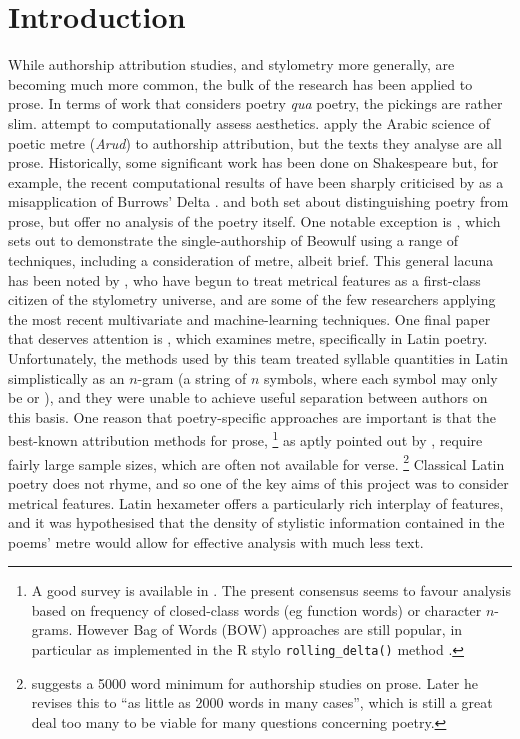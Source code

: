 \documentclass[11pt,a4paper]{scrartcl} %
\begin{document}
\setlength{\parindent}{0.3in}\section{Introduction}
While authorship attribution studies, and stylometry more generally, are becoming much more common, the bulk of the research has been applied to prose. In terms of work that considers poetry \textit{qua} poetry, the pickings are rather slim.  attempt to computationally assess aesthetics.  apply the Arabic science of poetic metre (\textit{Arud}) to authorship attribution, but the texts they analyse are all prose. Historically, some significant work has been done on Shakespeare but, for example, the recent computational results of  have been sharply criticised by  as a misapplication of Burrows' Delta \cite{burrows_delta:_2002}.  and  both set about distinguishing poetry from prose, but offer no analysis of the poetry itself. One notable exception is , which sets out to demonstrate the single-authorship of Beowulf using a range of techniques, including a consideration of metre, albeit brief. This general lacuna has been noted by , who have begun to treat metrical features as a first-class citizen of the stylometry universe, and are some of the few researchers applying the most recent multivariate and machine-learning techniques. One final paper that deserves attention is , which examines metre, specifically in Latin poetry. Unfortunately, the methods used by this team treated syllable quantities in Latin simplistically as an $n$-gram (a string of $n$ symbols, where each symbol may only be  or \metricsymbols{_}), and they were unable to achieve useful separation between authors on this basis. One reason that poetry-specific approaches are important is that the best-known attribution methods for prose,%
%
\footnote{A good survey is available in . The present consensus seems to favour analysis based on frequency of closed-class words (eg function words) or character $n$-grams. However Bag of Words (BOW) approaches are still popular, in particular as implemented in the R stylo \texttt{rolling\_delta()} method .}
as aptly pointed out by , require fairly large sample sizes, which are often not available for verse.%
%
\footnote{ suggests a 5000 word minimum for authorship studies on prose. Later \citeyear[4]{eder_short_2017} he revises this to ``as little as 2000 words in many cases'', which is still a great deal too many to be viable for many questions concerning poetry.}
%
Classical Latin poetry does not rhyme, and so one of the key aims of this project was to consider metrical features. Latin hexameter offers a particularly rich interplay of features, and it was hypothesised that the density of stylistic information contained in the poems' metre would allow for effective analysis with much less text.
\end{document}
